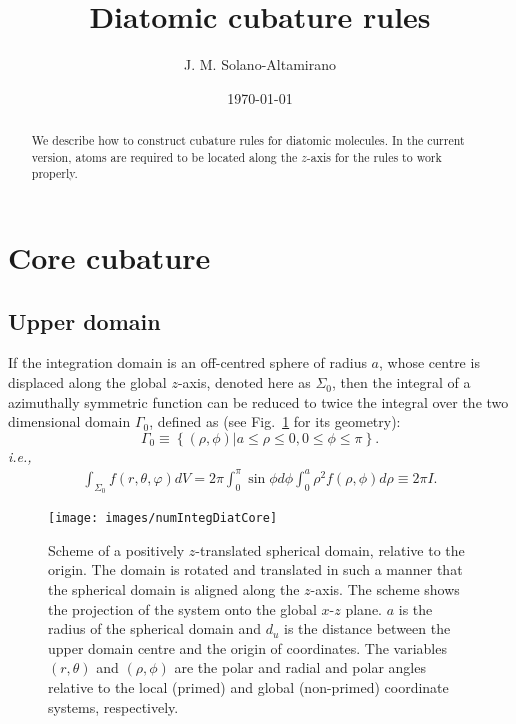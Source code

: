 \documentclass[11pt]{amsart}
\title{Diatomic cubature rules}
\author{J. M. Solano-Altamirano}
\date{\today}                                           %
\begin{document}
\begin{abstract}
We describe how to construct cubature rules for diatomic molecules. In the current version,
atoms are required to be located along the $z$-axis for the rules to work properly.
\end{abstract}
\maketitle


\section{Core cubature}
\subsection{Upper domain}

If the integration domain is an off-centred sphere of radius $a$, whose centre is displaced along
the global $z$-axis, denoted here as $\Sigma_0$, then
the integral of a azimuthally symmetric function can be reduced to twice the integral
over the two dimensional domain $\Gamma_0$, defined as (see Fig.~\ref{fig:offcentsphdom}
for its geometry):
\begin{equation}
	\Gamma_0\equiv\left\{
		(\rho,\phi) |a\leq\rho\leq0,0\leq\phi\leq\pi
	\right\}.
\end{equation}
%
\textit{i.e.,}
\begin{eqnarray}
	\int_{\Sigma_0}f(r,\theta,\varphi)dV=2\pi\int_0^{\pi}\sin\phi d\phi\int_0^a%
	\rho^2f(\rho,\phi)d\rho\equiv2\pi I.
\end{eqnarray}

\begin{figure}[htb!]
   \centering
   \texttt{[image: images/numIntegDiatCore]}
   \caption{Scheme of a positively $z$-translated spherical domain, relative to the origin.
   The domain is rotated and translated in such a manner that the spherical domain is
   aligned along the $z$-axis. The scheme shows the projection of the system onto the global 
   $x$-$z$ plane. $a$ is the radius of the spherical domain and $d_u$ is the distance
   between the upper domain centre and the origin of coordinates. The variables
   $(r,\theta)$ and $(\rho,\phi)$ are the polar and radial and polar angles
   relative to the local (primed) and global (non-primed) coordinate systems, respectively.}
   \label{fig:offcentsphdom}
\end{figure}
\end{document}
